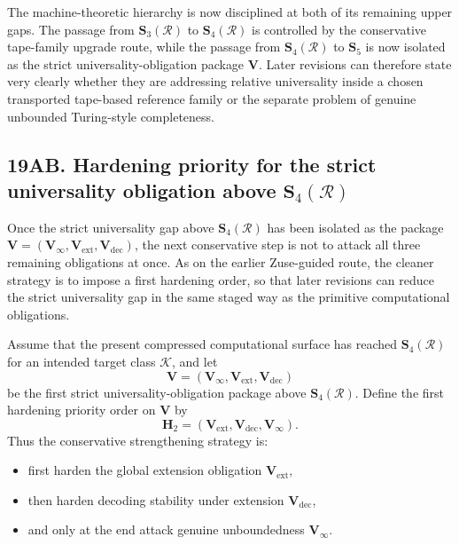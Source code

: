 \begin{corollary}
The machine-theoretic hierarchy is now disciplined at both of its remaining upper gaps. The passage from \(\mathbf S_3(\mathcal R)\) to \(\mathbf S_4(\mathcal R)\) is controlled by the conservative tape-family upgrade route, while the passage from \(\mathbf S_4(\mathcal R)\) to \(\mathbf S_5\) is now isolated as the strict universality-obligation package \(\mathbf V\). Later revisions can therefore state very clearly whether they are addressing relative universality inside a chosen transported tape-based reference family or the separate problem of genuine unbounded Turing-style completeness.
\end{corollary}


\subsection*{19AB. Hardening priority for the strict universality obligation above \(\mathbf S_4(\mathcal R)\)}
Once the strict universality gap above \(\mathbf S_4(\mathcal R)\) has been isolated as the package \(\mathbf V=(\mathbf V_\infty,\mathbf V_{\mathrm{ext}},\mathbf V_{\mathrm{dec}})\), the next conservative step is not to attack all three remaining obligations at once. As on the earlier Zuse-guided route, the cleaner strategy is to impose a first hardening order, so that later revisions can reduce the strict universality gap in the same staged way as the primitive computational obligations.

\begin{definition}
Assume that the present compressed computational surface has reached \(\mathbf S_4(\mathcal R)\) for an intended target class \(\mathcal K\), and let
\[
\mathbf V=(\mathbf V_\infty,\mathbf V_{\mathrm{ext}},\mathbf V_{\mathrm{dec}})
\]
be the first strict universality-obligation package above \(\mathbf S_4(\mathcal R)\).
Define the first hardening priority order on \(\mathbf V\) by
\[
\mathbf H_2=(\mathbf V_{\mathrm{ext}},\mathbf V_{\mathrm{dec}},\mathbf V_\infty).
\]
Thus the conservative strengthening strategy is:
\begin{itemize}[leftmargin=2em]
  \item first harden the global extension obligation \(\mathbf V_{\mathrm{ext}}\),
  \item then harden decoding stability under extension \(\mathbf V_{\mathrm{dec}}\),
  \item and only at the end attack genuine unboundedness \(\mathbf V_\infty\).
\end{itemize}
\end{definition}


